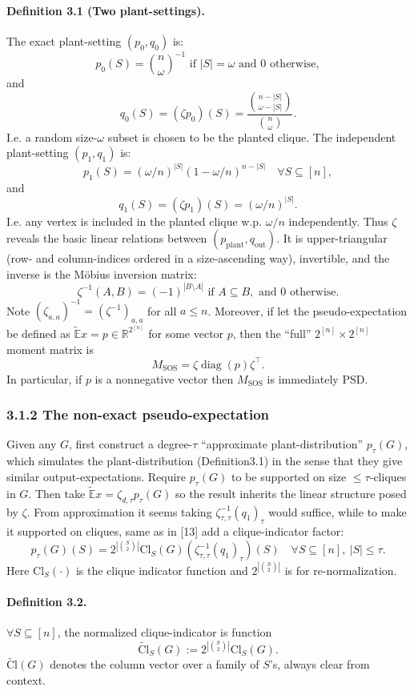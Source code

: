 \documentclass[10pt,a4paper]{article}
\begin{document}
\paragraph{Definition 3.1 (Two plant-settings).} The exact plant-setting $(p_0,q_0)$ is:
\[p_0(S)=\binom n\omega^{-1}\text{ if }|S|=\omega\text{ and }0\text{ otherwise},\tag{3.3}\]
and
\[q_0(S)=(\zeta p_0)(S)=\frac{\binom{n-|S|}{\omega-|S|}}{\binom n\omega}.\tag{3.4}\]
I.e. a random size-$\omega$ subset is chosen to be the planted clique. The independent plant-setting $(p_1,q_1)$ is:
\[p_1(S)=(\omega/n)^{|S|}(1-\omega/n)^{n-|S|}\quad\forall S\subseteq[n],\tag{3.5}\]
and
\[q_1(S)=(\zeta p_1)(S)=(\omega/n)^{|S|}.\tag{3.6}\]
I.e. any vertex is included in the planted clique w.p. $\omega/n$ independently.
Thus $\zeta$ reveals the basic linear relations between $(p_{\mathrm{plant}},q_{\mathrm{out}})$. It is upper-triangular (row- and column-indices ordered in a size-ascending way), invertible, and the inverse is the M\"obius inversion matrix:
\[\zeta^{-1}(A,B)=(-1)^{|B\setminus A|}\text{ if }A\subseteq B,\text{ and }0\text{ otherwise}.\]
Note $(\zeta_{a,a})^{-1}=(\zeta^{-1})_{a,a}$ for all $a\le n$. Moreover, if let the pseudo-expectation be defined as $\widetilde{\mathbb E}x=p\in\mathbb R^{2^{[n]}}$ for some vector $p$, then the ``full'' $2^{[n]}\times2^{[n]}$ moment matrix is
\[M_{\mathrm{SOS}}=\zeta\operatorname{diag}(p)\zeta^\top.\tag{3.7}\]
In particular, if $p$ is a nonnegative vector then $M_{\mathrm{SOS}}$ is immediately PSD.
\subsubsection*{3.1.2 The non-exact pseudo-expectation}
Given any $G$, first construct a degree-$\tau$ ``approximate plant-distribution'' $p_\tau(G)$, which simulates the plant-distribution (Definition3.1) in the sense that they give similar output-expectations. Require $p_\tau(G)$ to be supported on size $\le\tau$-cliques in $G$. Then take $\widetilde{\mathbb E}x=\zeta_{d,\tau}p_\tau(G)$ so the result inherits the linear structure posed by $\zeta$. From approximation it seems taking $\zeta_{\tau,\tau}^{-1}(q_1)_\tau$ would suffice, while to make it supported on cliques, same as in [13] add a clique-indicator factor:
\[p_\tau(G)(S)=2^{|\binom S2|}\mathrm{Cl}_S(G)\left(\zeta_{\tau,\tau}^{-1}(q_1)_\tau\right)(S)\quad\forall S\subseteq[n],\ |S|\le\tau.\tag{3.8}\]
Here $\mathrm{Cl}_S(\cdot)$ is the clique indicator function and $2^{|\binom S2|}$ is for re-normalization.
\paragraph{Definition 3.2.} $\forall S\subseteq[n]$, the normalized clique-indicator is function \[\widetilde{\mathrm{Cl}}_S(G):=2^{|\binom S2|}\mathrm{Cl}_S(G).\tag{3.9}\]
$\widetilde{\mathrm{Cl}}(G)$ denotes the column vector over a family of $S$'s, always clear from context.
\end{document}
